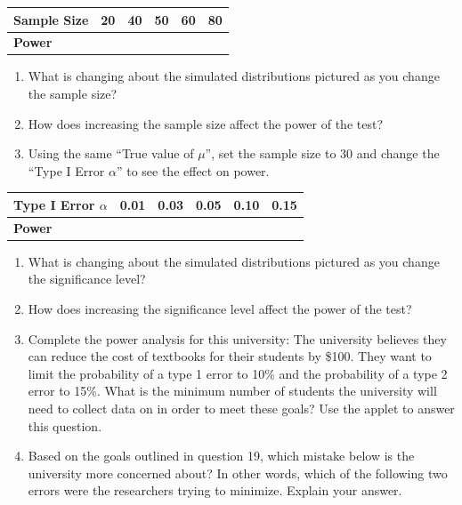 \documentclass[
]{report}
\begin{document}
\setlength\tabcolsep{0.6cm}
\begin{longtable}{|l|c|c|c|c|c|}
\hline
\textbf{Sample Size}& 20 & 40 & 50 & 60 & 80 \\ \hline
\textbf{Power} & & & & &  \\ \hline
\end{longtable}

\begin{enumerate}
\def\labelenumi{\arabic{enumi}.}
\setcounter{enumi}{13}
\item
  What is changing about the simulated distributions pictured as you change the sample size?
  \vspace{0.6in}
\item
  How does increasing the sample size affect the power of the test?
  \vspace{0.6in}
\item
  Using the same ``True value of \(\mu\)'', set the sample size to 30 and change the ``Type I Error \(\alpha\)'' to see the effect on power.
\end{enumerate}

\setlength\tabcolsep{0.5cm}
\begin{longtable}{|l|c|c|c|c|c|}
\hline
\textbf{Type I Error $\alpha$}& 0.01 & 0.03 & 0.05 & 0.10 & 0.15 \\ \hline
\textbf{Power} & & & & &  \\ \hline
\end{longtable}

\begin{enumerate}
\def\labelenumi{\arabic{enumi}.}
\setcounter{enumi}{16}
\item
  What is changing about the simulated distributions pictured as you change the significance level?
  \vspace{0.6in}
\item
  How does increasing the significance level affect the power of the test?
  \vspace{0.6in}
\item
  Complete the power analysis for this university: The university believes they can reduce the cost of textbooks for their students by \$100. They want to limit the probability of a type 1 error to 10\% and the probability of a type 2 error to 15\%. What is the minimum number of students the university will need to collect data on in order to meet these goals? Use the applet to answer this question.
  \vspace{0.4in}
\item
  Based on the goals outlined in question 19, which mistake below is the university more concerned about? In other words, which of the following two errors were the researchers trying to minimize. Explain your answer.
\end{enumerate}
\end{document}
